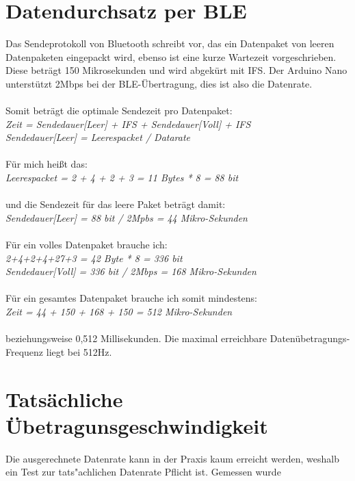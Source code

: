\section{Datendurchsatz per BLE}

Das Sendeprotokoll von Bluetooth schreibt vor, das ein Datenpaket von
leeren Datenpaketen eingepackt wird, ebenso ist eine kurze Wartezeit vorgeschrieben. 
Diese beträgt 150 Mikrosekunden und wird abgekürt mit IFS.
Der Arduino Nano unterstützt 2Mbps bei der BLE-Übertragung, dies ist also die Datenrate.\\
\\
Somit beträgt die optimale Sendezeit pro Datenpaket:\\
\textit{Zeit = Sendedauer[Leer] + IFS + Sendedauer[Voll] + IFS\\
Sendedauer[Leer] = Leerespacket / Datarate}\\
\\
Für mich heißt das:\\
\textit{Leerespacket = 2 + 4 + 2 + 3 = 11 Bytes * 8 = 88 bit}\\
\\
und die Sendezeit für das leere Paket beträgt damit:\\
\textit{Sendedauer[Leer] = 88 bit / 2Mpbs = 44 Mikro-Sekunden}\\
\\
Für ein volles Datenpaket brauche ich:\\
\textit{2+4+2+4+27+3 = 42 Byte * 8 = 336 bit\\
Sendedauer[Voll] = 336 bit / 2Mbps = 168 Mikro-Sekunden}\\
\\
Für ein gesamtes Datenpaket brauche ich somit mindestens:\\
\textit{Zeit = 44 + 150 + 168 + 150 = 512 Mikro-Sekunden}\\
\\
beziehungsweise 0,512 Millisekunden. Die maximal erreichbare Datenübetragungs-Frequenz
liegt bei 512Hz.


\section{Tatsächliche Übetragunsgeschwindigkeit}
Die ausgerechnete Datenrate kann in der Praxis kaum erreicht werden, weshalb ein Test zur 
tats"achlichen Datenrate Pflicht ist. Gemessen wurde 
